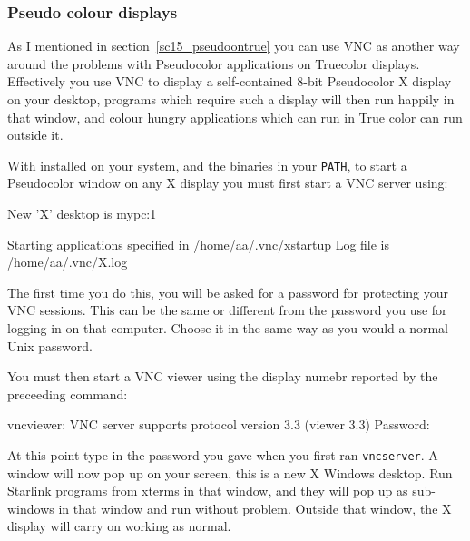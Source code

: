\documentclass[twoside,11pt]{starlink}
\begin{document}
\subsubsection{Pseudo colour displays}

As I mentioned in section~\ref{sc15_pseudoontrue} you can use VNC as
another way around the problems with Pseudocolor applications on
Truecolor displays. Effectively you use VNC to display a
self-contained 8-bit Pseudocolor X display on your desktop, programs
which require such a display will then run happily in that window, and
colour hungry applications which can run in True color can run outside
it.

With 
installed on your system, and the binaries in your \texttt{PATH}, to
start a Pseudocolor window on any X display you must first start a VNC
server using:

\begin{small}
\begin{terminalv}

        New 'X' desktop is mypc:1

        Starting applications specified in /home/aa/.vnc/xstartup
        Log file is /home/aa/.vnc/X.log
\end{terminalv}
\end{small}

The first time you do this, you will be asked for a password for
protecting your VNC sessions. This can be the same or different from
the password you use for logging in on that computer. Choose it in the
same way as you would a normal Unix password.

You must then start a VNC viewer using the display numebr reported by
the preceeding command:

\begin{small}
\begin{terminalv}
        vncviewer: VNC server supports protocol version 3.3 (viewer 3.3)
        Password:
\end{terminalv}
\end{small}

At this point type in the password you gave when you first ran \texttt{vncserver}. A window will now pop up on your screen, this is a new X
Windows desktop. Run Starlink programs from xterms in that window, and
they will pop up as sub-windows in that window and run without
problem. Outside that window, the X display will carry on working as
normal.
\end{document}
